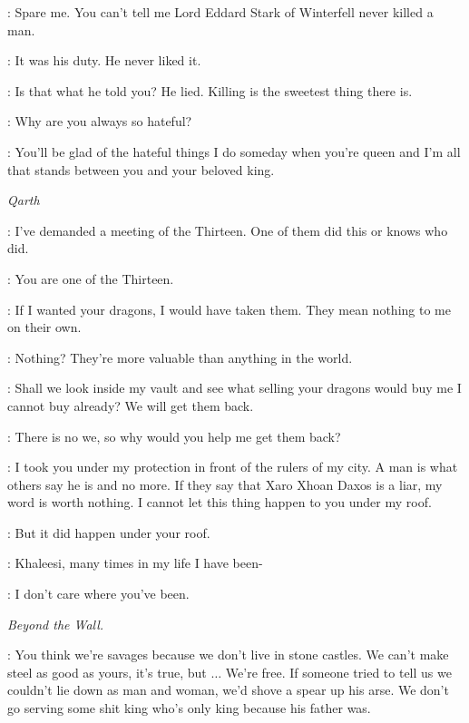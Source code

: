 \HOUND: Spare me. You can't tell me Lord Eddard Stark of Winterfell never killed a man.

\SANSA: It was his duty. He never liked it.

\HOUND: Is that what he told you? He lied. Killing is the sweetest thing there is.

\SANSA: Why are you always so hateful?

\HOUND: You'll be glad of the hateful things I do someday when you're queen and I'm all that stands between you and your beloved king.



\scene

\textit{Qarth}


\XARO: I've demanded a meeting of the Thirteen. One of them did this or knows who did.

\DAENERYS: You are one of the Thirteen.

\XARO: If I wanted your dragons, I would have taken them. They mean nothing to me on their own.

\DAENERYS: Nothing? They're more valuable than anything in the world.

\XARO: Shall we look inside my vault and see what selling your dragons would buy me I cannot buy already? We will get them back.

\DAENERYS: There is no we, so why would you help me get them back?

\XARO: I took you under my protection in front of the rulers of my city. A man is what others say he is and no more. If they say that Xaro Xhoan Daxos is a liar, my word is worth nothing. I cannot let this thing happen to you under my roof.

\DAENERYS: But it did happen under your roof.

\XARO: Khaleesi, many times in my life I have been-

\DAENERYS: I don't care where you've been.


\scene

\textit{Beyond the Wall.}


\YGRITTE: You think we're savages because we don't live in stone castles. We can't make steel as good as yours, it's true, but $\ldots$ We're free. If someone tried to tell us we couldn't lie down as man and woman, we'd shove a spear up his arse. We don't go serving some shit king who's only king because his father was.

